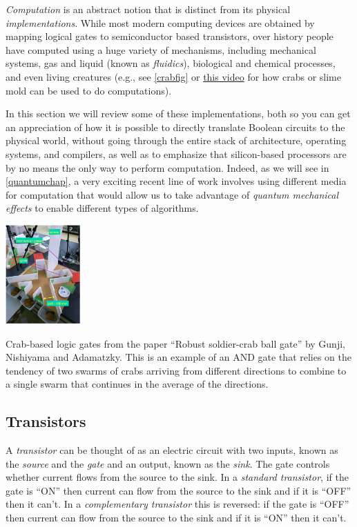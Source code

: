 \emph{Computation} is an abstract notion that is distinct from its
physical \emph{implementations}. While most modern computing devices are
obtained by mapping logical gates to semiconductor based transistors,
over history people have computed using a huge variety of mechanisms,
including mechanical systems, gas and liquid (known as \emph{fluidics}),
biological and chemical processes, and even living creatures (e.g., see
\cref{crabfig} or
\href{https://www.youtube.com/watch?v=czk4xgdhdY4}{this video} for how
crabs or slime mold can be used to do computations).

In this section we will review some of these implementations, both so
you can get an appreciation of how it is possible to directly translate
Boolean circuits to the physical world, without going through the entire
stack of architecture, operating systems, and compilers, as well as to
emphasize that silicon-based processors are by no means the only way to
perform computation. Indeed, as we will see in \cref{quantumchap}, a
very exciting recent line of work involves using different media for
computation that would allow us to take advantage of \emph{quantum
mechanical effects} to enable different types of algorithms.


\begin{marginfigure}
\centering
\includegraphics[width=\linewidth, height=1.5in, keepaspectratio]{../figure/crab-gate.jpg}
\caption{Crab-based logic gates from the paper ``Robust soldier-crab
ball gate'' by Gunji, Nishiyama and Adamatzky. This is an example of an
AND gate that relies on the tendency of two swarms of crabs arriving
from different directions to combine to a single swarm that continues in
the average of the directions.}
\label{crabfig}
\end{marginfigure}

\subsection{Transistors}\label{Transistors}

A \emph{transistor} can be thought of as an electric circuit with two
inputs, known as the \emph{source} and the \emph{gate} and an output,
known as the \emph{sink}. The gate controls whether current flows from
the source to the sink. In a \emph{standard transistor}, if the gate is
``ON'' then current can flow from the source to the sink and if it is
``OFF'' then it can't. In a \emph{complementary transistor} this is
reversed: if the gate is ``OFF'' then current can flow from the source
to the sink and if it is ``ON'' then it can't.


